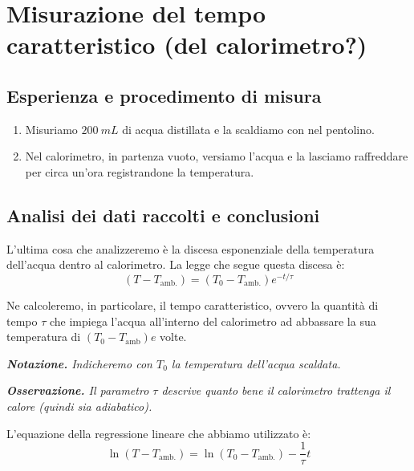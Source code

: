 \documentclass{article}
\begin{document}
\section{Misurazione del tempo caratteristico (del calorimetro?)}

\subsection{Esperienza e procedimento di misura}

\begin{enumerate}
    \item
        Misuriamo $\qty{200}{mL}$ di acqua distillata e la scaldiamo con nel
        pentolino.    %
    \item
        Nel calorimetro, in partenza vuoto, versiamo l'acqua e la lasciamo
        raffreddare per circa un'ora registrandone la temperatura.
\end{enumerate}

\subsection{Analisi dei dati raccolti e conclusioni}
L'ultima cosa che analizzeremo è la discesa esponenziale della temperatura    %
dell'acqua dentro al calorimetro. La legge che segue questa discesa è:
\[
    (T-T_\text{amb.})=(T_0-T_\text{amb.}) e^{-t/\tau}
\]

Ne calcoleremo, in particolare, il tempo caratteristico, ovvero la quantità
di tempo $\tau$ che impiega l'acqua all'interno del calorimetro ad abbassare
la sua temperatura di $(T_0 - T_\text{amb})e$ volte.

\emph{
    \textbf{Notazione.} Indicheremo con $T_0$ la temperatura
    dell'acqua scaldata.
}

\emph{
    \textbf{Osservazione.} Il parametro $\tau$ descrive quanto bene il
    calorimetro trattenga il calore (quindi sia adiabatico).
}

L'equazione della regressione lineare che abbiamo utilizzato è:
\[
    \ln(T-T_\text{amb.})=\ln(T_0-T_\text{amb.})-\frac{1}{\tau}t
\]
\end{document}
